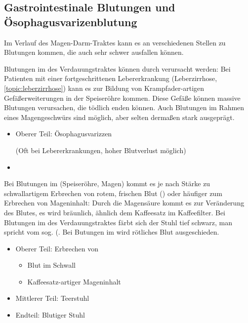 \subsection{Gastrointestinale
Blutungen und Ösophagusvarizenblutung}
\label{topic:oesophagusvarizenblutung}
\label{topic:gastrointestinale-blutung}

\nopagebreak[4]

{Im Verlauf des Magen-Darm-Traktes kann es an verschiedenen
Stellen zu Blutungen kommen, die auch sehr schwer ausfallen
können. 

Blutungen im  des Verdauungstraktes können
durch  verursacht werden: Bei Patienten
mit einer fortgeschrittenen Lebererkrankung (Leberzirrhose, \ref{topic:leberzirrhose}) kann es zur Bildung von Krampfader-artigen Gefäßerweiterungen in der Speiseröhre
kommen. Diese Gefäße können massive Blutungen verursachen,
die tödlich enden können. Auch Blutungen im Rahmen eines
Magengeschwürs sind möglich, aber selten dermaßen stark
ausgeprägt.



}
{
\begin{itemize}
    \item Oberer Teil: Ösophagusvarizzen
    
    (Oft bei
    Lebererkrankungen, hoher Blutverlust möglich)
    \item {}
\end{itemize}
}{}{}{}

{
Bei Blutungen im 
(Speiseröhre, Magen) kommt es je nach Stärke zu
schwallartigem Erbrechen  von rotem, frischen Blut () oder häufiger zum
Erbrechen von
Mageninhalt: Durch die Magensäure kommt es zur Veränderung
des Blutes, es wird bräunlich, ähnlich dem Kaffeesatz im
Kaffeefilter. Bei Blutungen im  des
Verdauungstraktes färbt sich der Stuhl tief schwarz, man
spricht vom sog.  (. Bei Butungen im
 wird rötliches Blut ausgeschieden. 

}{
\begin{itemize}
  \item Oberer Teil: Erbrechen von
  \begin{itemize}
    \item Blut im Schwall
    \item Kaffeesatz-artiger Mageninhalt
  \end{itemize} 
  \item Mittlerer Teil: Teerstuhl
  \item Endteil: Blutiger Stuhl
\end{itemize}
}{}{}{}

